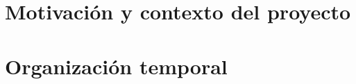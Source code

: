 \documentclass[a4paper,11pt]{book}
\begin{document}
\renewcommand{\figurename}{Figura}
\renewcommand{\listfigurename}{Indice de figuras}
\renewcommand{\tablename}{Tabla}
\renewcommand{\listtablename}{Indice de tablas}

\pagestyle{empty}

\cleardoublepage


\cleardoublepage
\pagestyle{plain}

\frontmatter %


\cleardoublepage

\tableofcontents
\listoffigures
\listoftables

\mainmatter %
\setlength{\parskip}{\baselineskip} %

\chapter{Motivación y contexto del proyecto}
\label{chap:introduccion}


\chapter{Organización temporal}
\label{chap:planificacion}


%

%

%

\setlength{\parskip}{0cm} %

\backmatter %


\clearpage
{}
{}



\end{document}
